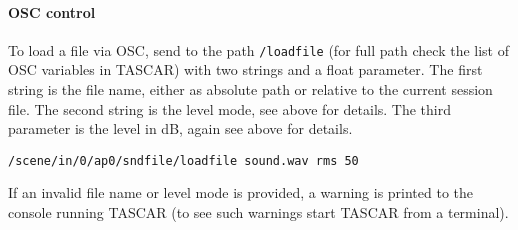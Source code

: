 \paragraph{OSC control}
%
To load a file via OSC, send to the path {\tt /loadfile} (for full
path check the list of OSC variables in TASCAR) with two strings and a
float parameter.
%
The first string is the file name, either as absolute path or relative
to the current session file. The second string is the level mode, see
above for details. The third parameter is the level in dB, again see
above for details.
%
\begin{verbatim}
/scene/in/0/ap0/sndfile/loadfile sound.wav rms 50
\end{verbatim}
%
If an invalid file name or level mode is provided, a warning is
printed to the console running TASCAR (to see such warnings start
TASCAR from a terminal).
